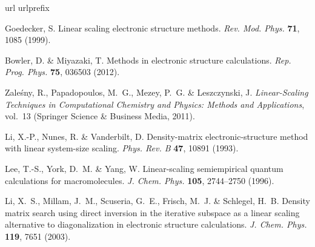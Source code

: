 \documentclass[10pt,amsmath,twocolumn,aps,prl,superscriptaddress,floatfix]{revtex4-1}
\begin{document}
%

\begin{thebibliography}{10}
\expandafter\ifx\csname url\endcsname\relax
  \def\url#1{\texttt{#1}}\fi
\expandafter\ifx\csname urlprefix\endcsname\relax\def\urlprefix{URL }\fi
\providecommand{\bibinfo}[2]{#2}
\providecommand{\eprint}[2][]{\url{#2}}

\bibinfo{author}{Goedecker, S.}
\newblock \bibinfo{title}{Linear scaling electronic structure methods}.
\newblock \emph{\bibinfo{journal}{Rev. Mod. Phys.}}
  \textbf{\bibinfo{volume}{71}}, \bibinfo{pages}{1085} (\bibinfo{year}{1999}).

\bibinfo{author}{Bowler, D.} \& \bibinfo{author}{Miyazaki, T.}
\newblock \bibinfo{title}{Methods in electronic structure calculations}.
\newblock \emph{\bibinfo{journal}{Rep. Prog. Phys.}}
  \textbf{\bibinfo{volume}{75}}, \bibinfo{pages}{036503}
  (\bibinfo{year}{2012}).

\bibinfo{author}{Zale{\'s}ny, R.}, \bibinfo{author}{Papadopoulos, M.~G.},
  \bibinfo{author}{Mezey, P.~G.} \& \bibinfo{author}{Leszczynski, J.}
\newblock \emph{\bibinfo{title}{Linear-Scaling Techniques in Computational
  Chemistry and Physics: Methods and Applications}}, vol.~\bibinfo{volume}{13}
  (\bibinfo{publisher}{Springer Science \& Business Media},
  \bibinfo{year}{2011}).

\bibinfo{author}{Li, X.-P.}, \bibinfo{author}{Nunes, R.} \&
  \bibinfo{author}{Vanderbilt, D.}
\newblock \bibinfo{title}{Density-matrix electronic-structure method with
  linear system-size scaling}.
\newblock \emph{\bibinfo{journal}{Phys. Rev. B}} \textbf{\bibinfo{volume}{47}},
  \bibinfo{pages}{10891} (\bibinfo{year}{1993}).

\bibinfo{author}{Lee, T.-S.}, \bibinfo{author}{York, D.~M.} \&
  \bibinfo{author}{Yang, W.}
\newblock \bibinfo{title}{Linear-scaling semiempirical quantum calculations for
  macromolecules}.
\newblock \emph{\bibinfo{journal}{J. Chem. Phys.}}
  \textbf{\bibinfo{volume}{105}}, \bibinfo{pages}{2744--2750}
  (\bibinfo{year}{1996}).

\bibinfo{author}{Li, X.~S.}, \bibinfo{author}{Millam, J.~M.},
  \bibinfo{author}{Scuseria, G.~E.}, \bibinfo{author}{Frisch, M.~J.} \&
  \bibinfo{author}{Schlegel, H.~B.}
\newblock \bibinfo{title}{Density matrix search using direct inversion in the
  iterative subspace as a linear scaling alternative to diagonalization in
  electronic structure calculations}.
\newblock \emph{\bibinfo{journal}{J. Chem. Phys.}}
  \textbf{\bibinfo{volume}{119}}, \bibinfo{pages}{7651} (\bibinfo{year}{2003}).


\end{thebibliography}
\end{document}
